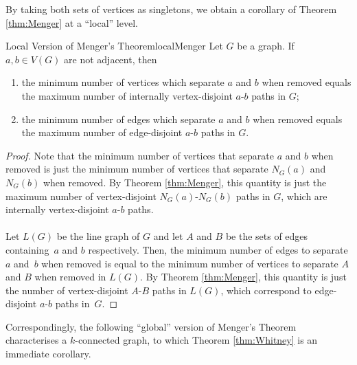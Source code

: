 \documentclass[math]{amznotes}
\theoremstyle{remark}
\newcommand{\0}{\mathbf{0}}
\newcommand{\1}{\mathbf{1}}
\begin{document}
By taking both sets of vertices as singletons, we obtain a corollary of Theorem \ref{thm:Menger} at a ``local'' level.
\begin{corbox}{Local Version of Menger's Theorem}{localMenger}
    Let $G$ be a graph. If $a, b \in V(G)$ are not adjacent, then 
    \begin{enumerate}
        \item the minimum number of vertices which separate $a$ and $b$ when removed equals the maximum number of internally vertex-disjoint $a$-$b$ paths in $G$;
        \item the minimum number of edges which separate $a$ and $b$ when removed equals the maximum number of edge-disjoint $a$-$b$ paths in $G$.
    \end{enumerate}
    \tcblower
    \begin{proof}
        Note that the minimum number of vertices that separate $a$ and $b$ when removed is just the minimum number of vertices that separate $N_G(a)$ and $N_G(b)$ when removed. By Theorem \ref{thm:Menger}, this quantity is just the maximum number of vertex-disjoint $N_G(a)$-$N_G(b)$ paths in $G$, which are internally vertex-disjoint $a$-$b$ paths.
        \\\\
        Let $L(G)$ be the line graph of $G$ and let $A$ and $B$ be the sets of edges containing~$a$ and $b$ respectively. Then, the minimum number of edges to separate $a$ and~$b$ when removed is equal to the minimum number of vertices to separate $A$ and $B$ when removed in $L(G)$. By Theorem \ref{thm:Menger}, this quantity is just the number of vertex-disjoint $A$-$B$ paths in $L(G)$, which correspond to edge-disjoint $a$-$b$ paths in~$G$.
    \end{proof}
\end{corbox}
Correspondingly, the following ``global'' version of Menger's Theorem characterises a $k$-connected graph, to which Theorem \ref{thm:Whitney} is an immediate corollary.
\end{document}
